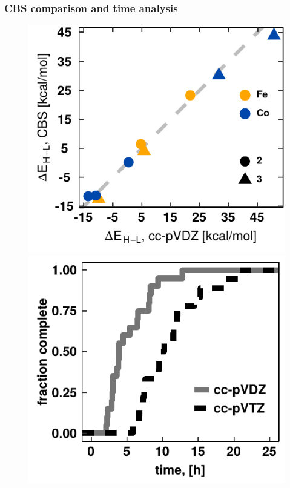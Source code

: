 \documentclass[xcolor=dvipsnames]{beamer}
\begin{document}
\begin{frame}
\frametitle{CBS comparison and time analysis}
\begin{figure}[ht] 
	\begin{minipage}[b]{0.5\linewidth}
		\centering
		\includegraphics[width=.8\linewidth]{img/splitCBSsDZ.pdf} 
	\end{minipage}%
	\begin{minipage}[b]{0.5\linewidth}
		\centering
		\includegraphics[width=.8\linewidth]{img/timeVsBasis.pdf} 
	\end{minipage}
\end{figure}
\end{frame}
\end{document}
